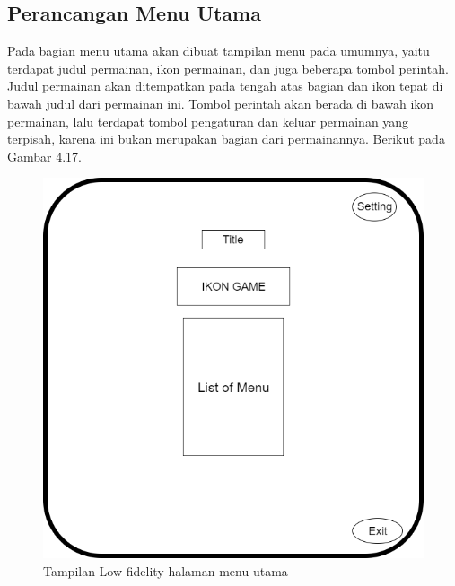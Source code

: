 	\subsection{Perancangan Menu Utama}
	Pada bagian menu utama akan dibuat tampilan menu pada umumnya, yaitu terdapat judul permainan, ikon permainan, dan juga beberapa tombol perintah. Judul permainan akan ditempatkan pada tengah atas bagian dan ikon tepat di bawah judul dari permainan ini. Tombol perintah akan berada di bawah ikon permainan, lalu terdapat tombol pengaturan dan keluar permainan yang terpisah, karena ini bukan merupakan bagian dari permainannya. Berikut pada Gambar 4.17.
	\begin{figure}
		\centering
		\includegraphics[width=\linewidth-80pt]{pics/low/low1}
		\caption{Tampilan Low fidelity halaman menu utama}
	\end{figure}
	
